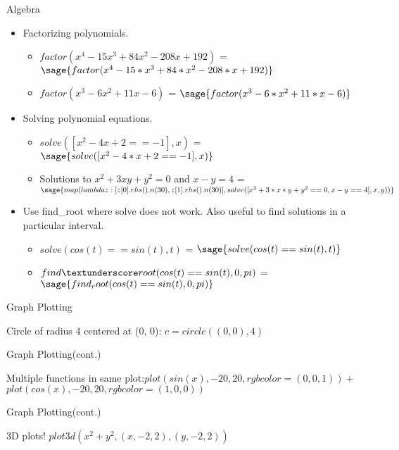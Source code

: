 \documentclass{beamer}
\begin{document}
\begin{frame}{Algebra}
  \begin{itemize}
    \item Factorizing polynomials.
    \begin{itemize}
      \item $factor(x^{4} - 15 x^{3} + 84 x^{2} - 208 x + 192)$ = $\sage{factor(x^4 - 15*x^3 + 84*x^2 - 208*x + 192)}$
      \item $factor(x^{3} - 6 x^{2} +11 x -6)$ = $\sage{factor(x^3 - 6*x^2 +11*x -6)}$
    \end{itemize}
    \item Solving polynomial equations.
    \begin{itemize}
     \item $solve([x^{2} - 4 x + 2 == -1], x)$ = $\sage{solve([x^2 - 4*x + 2 == -1], x)}$
     \item Solutions to $x^{2}+ 3 x y + y^{2} = 0$ and $x - y = 4$ = $\sage{map(lambda z: [z[0].rhs().n(30), z[1].rhs().n(30)], solve([x^2+3*x*y+y^2 == 0, x - y == 4], x, y))}$
    \end{itemize}
    \item Use find\_root where solve does not work. Also useful to find solutions in a particular interval.
    \begin{itemize}
     \item $solve(cos(t) == sin(t), t)$ = $\sage{solve(cos(t) == sin(t), t)}$
     \item $find \textunderscore root(cos(t) == sin(t), 0, pi)$ = $\sage{find_root(cos(t) == sin(t), 0, pi)}$
    \end{itemize}
  \end{itemize}
\end{frame}

\begin{frame}{Graph Plotting}
  \begin{center}
    Circle of radius 4 centered at (0, 0): $c = circle((0, 0), 4)$
  \end{center}
\end{frame}

\begin{frame}{Graph Plotting(cont.)}
  \begin{center}
    Multiple functions in same plot:$plot(sin(x), -20, 20, rgbcolor = (0, 0, 1)) +$ \\ $plot(cos(x), -20, 20, rgbcolor = (1, 0, 0))$
  \end{center}
\end{frame}

\begin{frame}{Graph Plotting(cont.)}
  \begin{center}
    3D plots! $plot3d(x^2 + y^2, (x, -2, 2), (y, -2, 2))$
  \end{center}
\end{frame}
\end{document}
